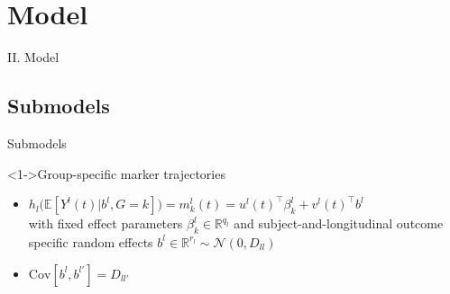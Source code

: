 \documentclass{beamer}
\newcommand{\E}{\mathbb E}
\newcommand{\R}{\mathbb R}
\newcommand{\cN}{\mathcal N}
\begin{document}
\section{Model}

\begin{frame}[noframenumbering]
\Large \centering
\textcolor{blue_pres}{II.} Model
\end{frame}

\subsection{Submodels}

\begin{frame}{Submodels}

\small
\begin{block}<1->{Group-specific marker trajectories}
\begin{itemize}
  \item<1-> \footnotesize $h_l\big(\E[Y^l(t)|b^l, G=k]\big) = m_k^l(t) = u^l(t)^\top\beta_k^l + v^l(t)^\top b^l$\\
  with fixed effect parameters $\beta_k^l \in \R^{q_l}$ and subject-and-longitudinal outcome specific random effects $b^l \in \R^{r_l} \sim \cN(0, D_{ll})$
  \item<2-> $\text{Cov}[b^l,b^{l'}] = D_{ll'}$

\end{itemize}
\end{block}


\end{frame}
\end{document}
